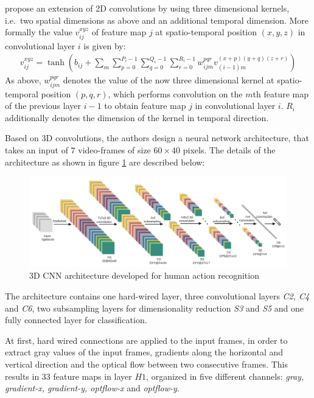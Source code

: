 \textcite{ji_3d_2013} propose an extension of 2D convolutions by using three dimensional kernels, i.e.\ two spatial dimensions as above and an additional temporal dimension.
More formally the value $v_{ij}^{xyz}$ of feature map $j$ at spatio-temporal position $(x,y,z)$ in convolutional layer $i$ is given by:
\begin{align*}
    v_{ij}^{xyz} = \tanh \left( b_{ij} + \sum_m \sum_{p=0}^{P_i -1} \sum_{q = 0}^{Q_i - 1} \sum_{r = 0}^{R_i - 1} w_{ijm}^{pqr} v_{(i-1)m}^{(x+p)(y+q)(z+r)} \right)
\end{align*}
As above, $w_{ijm}^{pqr}$ denotes the value of the now three dimensional kernel at spatio-temporal position $(p,q,r)$, which performs convolution on the $m$th feature map of the previous layer $i-1$ to obtain feature map $j$ in convolutional layer $i$.
$R_i$ additionally denotes the dimension of the kernel in temporal direction. 

Based on 3D convolutions, the authors design a neural network architecture, that takes an input of $7$ video-frames of size $60 \times 40$ pixels.
The details of the architecture as shown in figure \ref{fig:3dconv_architecture} are described below:

\begin{figure}[H]
    \centering
    \includegraphics[width=\textwidth]{img_deep/3dconv_architecture}
    \caption{3D CNN architecture developed for human action recognition \cite{ji_3d_2013}}
    \label{fig:3dconv_architecture}
\end{figure}
The architecture contains one hard-wired layer, three convolutional layers \textit{C2, C4} and \textit{C6}, two subsampling layers for dimensionality reduction \textit{S3} and \textit{S5} and one fully connected layer for classification.

At first, hard wired connections are applied to the input frames, in order to extract gray values of the input frames, gradients along the horizontal and vertical direction and the optical flow between two consecutive frames. This results in 33 feature maps in layer $H1$, organized in five different channels: \textit{gray, gradient-x, gradient-y, optflow-x} and \textit{optflow-y}.

